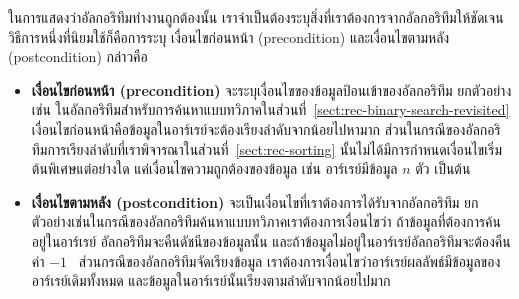 ใน{\wbr}การ{\wbr}แสดง{\wbr}ว่า{\wbr}อัล{\wbr}กอ{\wbr}ริ{\wbr}ทึม{\wbr}ทำงาน{\wbr}ถูกต้อง{\wbr}นั้น{\wbr}
เรา{\wbr}จำเป็น{\wbr}ต้อง{\wbr}ระบุ{\wbr}สิ่ง{\wbr}ที่{\wbr}เรา{\wbr}ต้องการ{\wbr}จาก{\wbr}อัล{\wbr}กอ{\wbr}ริ{\wbr}ทึม{\wbr}ให้{\wbr}ชัดเจน วิธีการ{\wbr}หนึ่ง{\wbr}ที่{\wbr}นิยม{\wbr}ใช้{\wbr}ก็{\wbr}คือ{\wbr}การ{\wbr}ระบุ เงื่อนไข{\wbr}ก่อนหน้า (precondition) และ{\wbr}เงื่อนไข{\wbr}ตาม{\wbr}หลัง (postcondition) กล่าวคือ{\wbr}

\begin{itemize}
\item {\bf เงื่อนไข{\wbr}ก่อนหน้า (precondition)}
  จะ{\wbr}ระบุ{\wbr}เงื่อนไข{\wbr}ของ{\wbr}ข้อมูล{\wbr}ป้อน{\wbr}เข้า{\wbr}ของ{\wbr}อัล{\wbr}กอ{\wbr}ริ{\wbr}ทึม ยก{\wbr}ตัวอย่าง{\wbr}เช่น{\wbr}
  ใน{\wbr}อัล{\wbr}กอ{\wbr}ริ{\wbr}ทึม{\wbr}สำหรับ{\wbr}การ{\wbr}ค้นหา{\wbr}แบบ{\wbr}ทวิภาค{\wbr}ใน{\wbr}ส่วน{\wbr}ที่~\ref{sect:rec-binary-search-revisited}
  เงื่อนไข{\wbr}ก่อนหน้า{\wbr}คือ{\wbr}ข้อมูล{\wbr}ใน{\wbr}อาร์เรย์{\wbr}จะ{\wbr}ต้อง{\wbr}เรียงลำดับ{\wbr}จาก{\wbr}น้อย{\wbr}ไป{\wbr}หา{\wbr}มาก{\wbr}
  ส่วน{\wbr}ใน{\wbr}กรณี{\wbr}ของ{\wbr}อัล{\wbr}กอ{\wbr}ริ{\wbr}ทึม{\wbr}การ{\wbr}เรียงลำดับ{\wbr}ที่{\wbr}เรา{\wbr}พิจารณา{\wbr}ใน{\wbr}ส่วน{\wbr}ที่~\ref{sect:rec-sorting}
  นั้น{\wbr}ไม่{\wbr}ได้{\wbr}มี{\wbr}การ{\wbr}กำหนด{\wbr}เงื่อนไข{\wbr}เริ่มต้น{\wbr}พิเศษ{\wbr}แต่อย่างใด แค่{\wbr}เงื่อนไข{\wbr}ความ{\wbr}ถูกต้อง{\wbr}ของ{\wbr}ข้อมูล เช่น{\wbr}
  อาร์เรย์มี{\wbr}ข้อมูล $n$ ตัว เป็นต้น{\wbr}
\item {\bf เงื่อนไข{\wbr}ตาม{\wbr}หลัง (postcondition)}
  จะ{\wbr}เป็น{\wbr}เงื่อนไข{\wbr}ที่{\wbr}เรา{\wbr}ต้องการ{\wbr}ได้{\wbr}รับ{\wbr}จาก{\wbr}อัล{\wbr}กอ{\wbr}ริ{\wbr}ทึม{\wbr}
  ยก{\wbr}ตัวอย่าง{\wbr}เช่น{\wbr}ใน{\wbr}กรณี{\wbr}ของ{\wbr}อัล{\wbr}กอ{\wbr}ริ{\wbr}ทึม{\wbr}ค้นหา{\wbr}แบบ{\wbr}ทวิภาค{\wbr}เรา{\wbr}ต้องการ{\wbr}เงื่อนไข{\wbr}ว่า{\wbr}
  ถ้า{\wbr}ข้อมูล{\wbr}ที่{\wbr}ต้องการ{\wbr}ค้น{\wbr}อยู่{\wbr}ใน{\wbr}อาร์เรย์ อัล{\wbr}กอ{\wbr}ริ{\wbr}ทึม{\wbr}จะ{\wbr}คืน{\wbr}ดัชนี{\wbr}ของ{\wbr}ข้อมูล{\wbr}นั้น{\wbr}
  และ{\wbr}ถ้า{\wbr}ข้อมูล{\wbr}ไม่{\wbr}อยู่{\wbr}ใน{\wbr}อาร์เรย์อัล{\wbr}กอ{\wbr}ริ{\wbr}ทึม{\wbr}จะ{\wbr}ต้อง{\wbr}คืน{\wbr}ค่า $-1$
  \ ส่วน{\wbr}กรณี{\wbr}ของ{\wbr}อัล{\wbr}กอ{\wbr}ริ{\wbr}ทึม{\wbr}จัดเรียง{\wbr}ข้อมูล{\wbr}
  เรา{\wbr}ต้องการ{\wbr}เงื่อนไข{\wbr}ว่า{\wbr}อาร์เรย์{\wbr}ผลลัพธ์{\wbr}มี{\wbr}ข้อมูล{\wbr}ของ{\wbr}อาร์เรย์{\wbr}เดิม{\wbr}ทั้งหมด{\wbr}
  และ{\wbr}ข้อมูล{\wbr}ใน{\wbr}อาร์เรย์{\wbr}นั้น{\wbr}เรียง{\wbr}ตาม{\wbr}ลำดับ{\wbr}จาก{\wbr}น้อย{\wbr}ไป{\wbr}มาก{\wbr}
\end{itemize}

